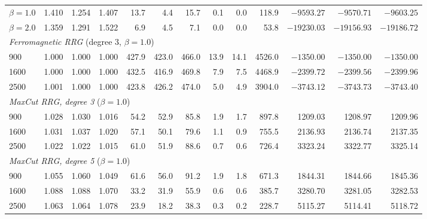 \documentclass[conference]{IEEEtran}
\begin{document}
\begin{table}[t]
\begin{tabular}{l rrr rrr rrr rrr}
    $\beta=1.0$ & 1.410 & 1.254 & 1.407 & 13.7 & 4.4 & 15.7 & 0.1 & 0.0 & 118.9 & $-9593.27$ & $-9570.71$ & $-9603.25$ \\
    $\beta=2.0$ & 1.359 & 1.291 & 1.522 & 6.9 & 4.5 & 7.1 & 0.0 & 0.0 & 53.8  & $-19230.03$ & $-19156.93$ & $-19186.72$ \\
    \multicolumn{13}{l}{\textit{Ferromagnetic RRG} (degree 3, $\beta=1.0$)} \\
    900  & 1.000 & 1.000 & 1.000 & 427.9 & 423.0 & 466.0 & 13.9 & 14.1 & 4526.0 & $-1350.00$ & $-1350.00$ & $-1350.00$ \\
    1600 & 1.000 & 1.000 & 1.000 & 432.5 & 416.9 & 469.8 & 7.9  & 7.5  & 4468.9 & $-2399.72$ & $-2399.56$ & $-2399.96$ \\
    2500 & 1.001 & 1.000 & 1.000 & 423.8 & 426.2 & 474.0 & 5.0  & 4.9  & 3904.0 & $-3743.12$ & $-3743.73$ & $-3743.40$ \\
    \multicolumn{13}{l}{\textit{MaxCut RRG, degree 3} ($\beta=1.0$)} \\
    900  & 1.028 & 1.030 & 1.016 & 54.2 & 52.9 & 85.8 & 1.9 & 1.7 & 897.8 & 1209.03 & 1208.97 & 1209.96 \\
    1600 & 1.031 & 1.037 & 1.020 & 57.1 & 50.1 & 79.6 & 1.1 & 0.9 & 755.5 & 2136.93 & 2136.74 & 2137.35 \\
    2500 & 1.022 & 1.022 & 1.015 & 61.0 & 51.9 & 88.6 & 0.7 & 0.6 & 726.4 & 3323.24 & 3322.77 & 3325.14 \\
    \multicolumn{13}{l}{\textit{MaxCut RRG, degree 5} ($\beta=1.0$)} \\
    900  & 1.055 & 1.060 & 1.049 & 61.6 & 56.0 & 91.2 & 1.9 & 1.8 & 671.3 & 1844.31 & 1844.66 & 1845.36 \\
    1600 & 1.088 & 1.088 & 1.070 & 33.2 & 31.9 & 55.9 & 0.6 & 0.6 & 385.7 & 3280.70 & 3281.05 & 3282.53 \\
    2500 & 1.063 & 1.064 & 1.078 & 23.9 & 18.2 & 38.3 & 0.3 & 0.2 & 228.7 & 5115.27 & 5114.41 & 5118.72 \\
    \hline
  \end{tabular}
\end{table}
\end{document}
